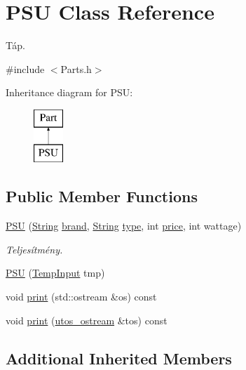 \hypertarget{class_p_s_u}{}\section{P\+SU Class Reference}
\label{class_p_s_u}


Táp.  




{\ttfamily \#include $<$Parts.\+h$>$}

Inheritance diagram for P\+SU\+:\begin{figure}[H]
\begin{center}
\leavevmode
\includegraphics[height=2.000000cm]{class_p_s_u}
\end{center}
\end{figure}
\subsection*{Public Member Functions}
\begin{DoxyCompactItemize}
\item 
\mbox{\hyperlink{class_p_s_u_a1077b85dde400327880d6f37ebaeef49}{P\+SU}} (\mbox{\hyperlink{class_string}{String}} \mbox{\hyperlink{class_part_ae06f2fdeb7fbbdb229a7aca151f3e341}{brand}}, \mbox{\hyperlink{class_string}{String}} \mbox{\hyperlink{class_part_a101dbcc5c4b21564df7414c7eb0eae88}{type}}, int \mbox{\hyperlink{class_part_a8e71223aed1da95a974f33d8d6c91bb1}{price}}, int wattage)
\begin{DoxyCompactList}\small\item\em Teljesítmény. \end{DoxyCompactList}\item 
\mbox{\hyperlink{class_p_s_u_ac6b366346dc0d2263a94b832843ab6b2}{P\+SU}} (\mbox{\hyperlink{struct_temp_input}{Temp\+Input}} tmp)
\item 
void \mbox{\hyperlink{class_p_s_u_ad8f95676e09f5ba805dbba50759f44ba}{print}} (std\+::ostream \&os) const
\item 
void \mbox{\hyperlink{class_p_s_u_a81c74aa3a327003c58b89ca2b8602c1d}{print}} (\mbox{\hyperlink{structutos__ostream}{utos\+\_\+ostream}} \&tos) const
\end{DoxyCompactItemize}
\subsection*{Additional Inherited Members}


